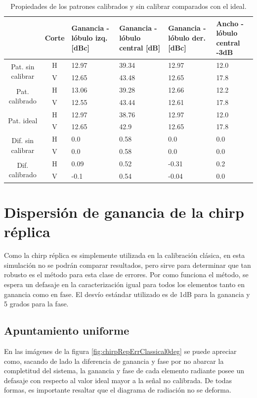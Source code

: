 \begin{table}[H]
  \footnotesize
  \centering
  \begin{tabular}{|c|c|p{2cm}|p{2.5cm}|p{2.5cm}|p{2.5cm}|}
    \cline{2-6}
    \multicolumn{1}{c|}{} & Corte & Ganancia - lóbulo izq. [dBc] & Ganancia - lóbulo central [dB] &
    Ganancia - lóbulo der. [dBc] & Ancho - lóbulo central -3dB \tabularnewline\hline
    \multirow{2}{2cm}{Pat. sin calibrar} & H & 12.97 & 39.34 & 12.97 & 12.0 \tabularnewline\cline{2-6}
     & V & 12.65 & 43.48 & 12.65 & 17.8 \tabularnewline\hline
    \multirow{2}{2cm}{Pat. calibrado} & H & 13.06 & 39.28 & 12.66 & 12.2 \tabularnewline\cline{2-6}
     & V & 12.55 & 43.44 & 12.61 & 17.8 \tabularnewline\hline
    \multirow{2}{2cm}{Pat. ideal} & H & 12.97 & 38.76 & 12.97 & 12.0 \tabularnewline\cline{2-6}
     & V & 12.65 & 42.9 & 12.65 & 17.8 \tabularnewline\hline
    \multirow{2}{2cm}{Dif. sin calibrar} & H & 0.0 & 0.58 & 0.0 & 0.0\tabularnewline\cline{2-6}
     & V & 0.0 & 0.58 & 0.0 & 0.0 \tabularnewline\hline
    \multirow{2}{2cm}{Dif. calibrado} & H & 0.09 & 0.52 & -0.31 & 0.2 \tabularnewline\cline{2-6}
     & V & -0.1 & 0.54 & -0.04 & 0.0 \tabularnewline\hline
  \end{tabular}
  \caption{Propiedades de los patrones calibrados y sin calibrar comparados con el ideal.}
  \label{tab:chirpErrMutual10degRow}
\end{table}


\section{Dispersión de ganancia de la chirp réplica}

Como la chirp réplica es simplemente utilizada en la calibración clásica, en esta simulación no se podrán comparar 
resultados, pero sirve para determinar que tan robusto es el método para esta clase de errores. Por como funciona el método, 
se espera un defasaje en la caracterización igual para todos los elementos tanto en ganancia como en fase. El desvío estándar
utilizado es de 1dB para la ganancia y 5 grados para la fase.

\subsection{Apuntamiento uniforme}

En las imágenes de la figura \ref{fig:chirpRepErrClassical0deg} se puede apreciar como, sacando de lado la diferencia de 
ganancia y fase por no abarcar la completitud del sistema, la ganancia y fase de cada elemento radiante posee un defasaje con 
respecto al valor ideal mayor a la señal no calibrada. De todas formas, es importante resaltar que el diagrama de radiación no 
se deforma. 


